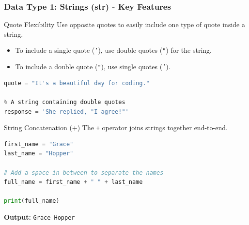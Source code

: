 \documentclass{beamer}
\begin{document}
\begin{frame}[fragile]
    \frametitle{Data Type 1: Strings (str) - Key Features}
    
    \begin{block}{Quote Flexibility}
        Use opposite quotes to easily include one type of quote inside a string.
        \begin{itemize}
            \item To include a single quote (\texttt{'}), use double quotes (\texttt{"}) for the string.
            \item To include a double quote (\texttt{"}), use single quotes (\texttt{'}).
        \end{itemize}
        \begin{lstlisting}[language=Python]
% A string containing an apostrophe (single quote)
quote = "It's a beautiful day for coding."

% A string containing double quotes
response = 'She replied, "I agree!"'
        \end{lstlisting}
    \end{block}
    
    \begin{block}{String Concatenation (+)}
        The \texttt{+} operator joins strings together end-to-end.
        \begin{lstlisting}[language=Python]
first_name = "Grace"
last_name = "Hopper"

# Add a space in between to separate the names
full_name = first_name + " " + last_name

print(full_name)
        \end{lstlisting}
        \textbf{Output:} \texttt{Grace Hopper}
    \end{block}
    
\end{frame}
\end{document}
